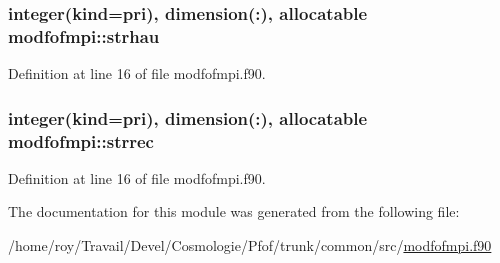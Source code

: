 \hypertarget{classmodfofmpi_a9ace6e4f0b23785f3b93fe1812b07c08}{
\subsubsection[{strhau}]{\setlength{\rightskip}{0pt plus 5cm}integer(kind=pri), dimension(\-:), allocatable modfofmpi\-::strhau}}\label{classmodfofmpi_a9ace6e4f0b23785f3b93fe1812b07c08}


Definition at line 16 of file modfofmpi.\-f90.

\hypertarget{classmodfofmpi_ada00af1a25f50e826521e9b2a7ecb633}{
\subsubsection[{strrec}]{\setlength{\rightskip}{0pt plus 5cm}integer(kind=pri), dimension(\-:), allocatable modfofmpi\-::strrec}}\label{classmodfofmpi_ada00af1a25f50e826521e9b2a7ecb633}


Definition at line 16 of file modfofmpi.\-f90.



The documentation for this module was generated from the following file\-:\begin{DoxyCompactItemize}
\item 
/home/roy/\-Travail/\-Devel/\-Cosmologie/\-Pfof/trunk/common/src/\hyperlink{modfofmpi_8f90}{modfofmpi.\-f90}\end{DoxyCompactItemize}

